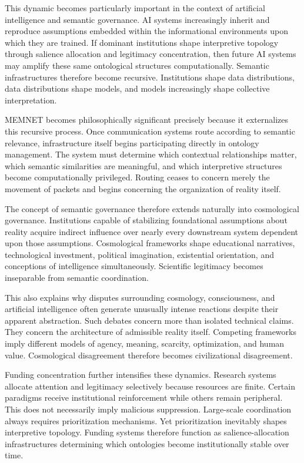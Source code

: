 \documentclass[11pt,a4paper]{article}
\begin{document}
This dynamic becomes particularly important in the context of artificial intelligence and semantic governance. AI systems increasingly inherit and reproduce assumptions embedded within the informational environments upon which they are trained. If dominant institutions shape interpretive topology through salience allocation and legitimacy concentration, then future AI systems may amplify these same ontological structures computationally. Semantic infrastructures therefore become recursive. Institutions shape data distributions, data distributions shape models, and models increasingly shape collective interpretation.

MEMNET becomes philosophically significant precisely because it externalizes this recursive process. Once communication systems route according to semantic relevance, infrastructure itself begins participating directly in ontology management. The system must determine which contextual relationships matter, which semantic similarities are meaningful, and which interpretive structures become computationally privileged. Routing ceases to concern merely the movement of packets and begins concerning the organization of reality itself.

The concept of semantic governance therefore extends naturally into cosmological governance. Institutions capable of stabilizing foundational assumptions about reality acquire indirect influence over nearly every downstream system dependent upon those assumptions. Cosmological frameworks shape educational narratives, technological investment, political imagination, existential orientation, and conceptions of intelligence simultaneously. Scientific legitimacy becomes inseparable from semantic coordination.

This also explains why disputes surrounding cosmology, consciousness, and artificial intelligence often generate unusually intense reactions despite their apparent abstraction. Such debates concern more than isolated technical claims. They concern the architecture of admissible reality itself. Competing frameworks imply different models of agency, meaning, scarcity, optimization, and human value. Cosmological disagreement therefore becomes civilizational disagreement.

Funding concentration further intensifies these dynamics. Research systems allocate attention and legitimacy selectively because resources are finite. Certain paradigms receive institutional reinforcement while others remain peripheral. This does not necessarily imply malicious suppression. Large-scale coordination always requires prioritization mechanisms. Yet prioritization inevitably shapes interpretive topology. Funding systems therefore function as salience-allocation infrastructures determining which ontologies become institutionally stable over time.
\end{document}
